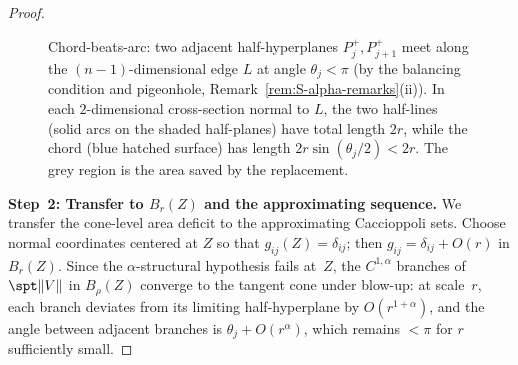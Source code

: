 \begin{proof}
\begin{figure}[ht]
        \caption{Chord-beats-arc: two adjacent half-hyperplanes $P_j^+, P_{j+1}^+$ meet along the $(n-1)$-dimensional edge $L$ at angle $\theta_j < \pi$ (by the balancing condition and pigeonhole, Remark~\ref{rem:S-alpha-remarks}(ii)). In each $2$-dimensional cross-section normal to $L$, the two half-lines (solid arcs on the shaded half-planes) have total length $2r$, while the chord (blue hatched surface) has length $2r\sin(\theta_j/2) < 2r$. The grey region is the area saved by the replacement.}
        \label{fig:chord-beats-arc}
    \end{figure}

\medskip\noindent\textbf{Step~2: Transfer to $B_r(Z)$ and the approximating sequence.}
We transfer the cone-level area deficit to the approximating Caccioppoli sets. Choose normal coordinates centered at $Z$ so that $g_{ij}(Z) = \delta_{ij}$; then $g_{ij} = \delta_{ij} + O(r)$ in $B_r(Z)$. Since the $\alpha$-structural hypothesis fails at~$Z$, the $C^{1,\alpha}$ branches of $\spt\|V\|$ in $B_\rho(Z)$ converge to the tangent cone under blow-up: at scale~$r$, each branch deviates from its limiting half-hyperplane by $O(r^{1+\alpha})$, and the angle between adjacent branches is $\theta_j + O(r^\alpha)$, which remains $< \pi$ for $r$ sufficiently small.


\end{proof}
